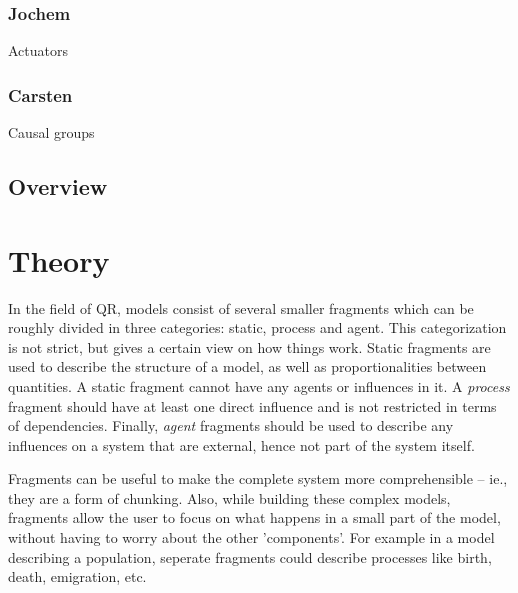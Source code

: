 \documentclass{article} %
\begin{document}

\subsubsection{Jochem}

Actuators



\subsubsection{Carsten}


Causal groups %

\subsection{Overview}



\newpage

\section{Theory}

In the field of QR, models %
consist of several smaller fragments which can be roughly divided in three
categories: static, process and agent. This categorization is not strict, but
gives a certain view on how things work. Static fragments are used to describe
the structure of a model, as well as proportionalities between quantities. A
static fragment cannot have any agents or influences in it. A \emph{process}
fragment should have at least one direct influence and is not restricted in
terms of dependencies. %
Finally, \emph{agent} fragments should be used to describe any influences on a
system that are external, hence not part of the system itself.

Fragments can be useful to make the complete system more comprehensible --
ie., they are a form of chunking.  Also, while building these complex models,
fragments allow the user to focus on what happens in a small part of the
model, without having to worry about the other 'components'. For example in a
model describing a population, seperate fragments could describe processes
like birth, death, emigration, etc.
\end{document}
